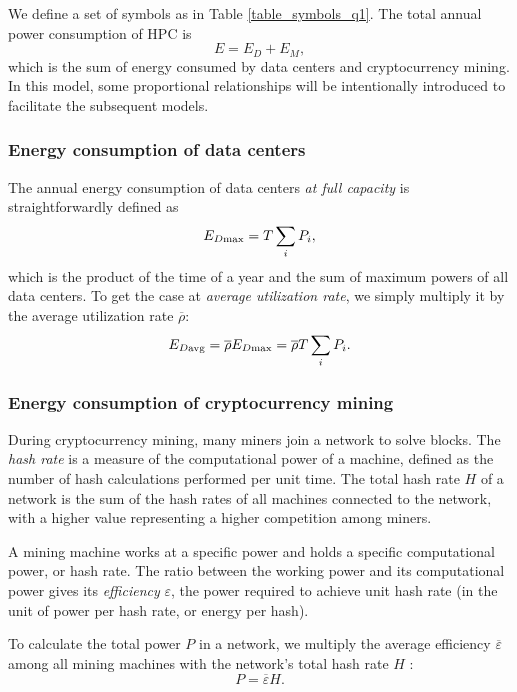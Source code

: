 \documentclass[12pt]{article}
\begin{document}
We define a set of symbols as in Table \ref{table_symbols_q1}. The total annual power consumption of HPC is
\begin{equation}
	E = E_D + E_M,
\end{equation}
which is the sum of energy consumed by data centers and cryptocurrency mining. In this model, some proportional relationships will be intentionally introduced to facilitate the subsequent models.

\subsubsection{Energy consumption of data centers}

The annual energy consumption of data centers \textit{at full capacity} is straightforwardly defined as
\begin{equation}
	E_{D \rm max} = T \sum_i P_i,
\end{equation}
which is the product of the time of a year and the sum of maximum powers of all data centers. To get the case at \textit{average utilization rate}, we simply multiply it by the average utilization rate $\overline{\rho}$:
\begin{equation}
	E_{D \rm avg} = \overline{\rho} E_{D \rm max} = \overline{\rho} T \sum_i P_i.
\end{equation}

\subsubsection{Energy consumption of cryptocurrency mining}

During cryptocurrency mining, many miners join a network to solve blocks. The \textit{hash rate} is a measure of the computational power of a machine, defined as the number of hash calculations performed per unit time. The total hash rate $H$ of a network is the sum of the hash rates of all machines connected to the network, with a higher value representing a higher competition among miners.

A mining machine works at a specific power and holds a specific computational power, or hash rate. The ratio between the working power and its computational power gives its \textit{efficiency} $\varepsilon$, the power required to achieve unit hash rate (in the unit of power per hash rate, or energy per hash).

To calculate the total power $P$ in a network, we multiply the average efficiency $\overline{\varepsilon}$ among all mining machines with the network's total hash rate $H$ \citep{btc_energy}:
\begin{equation}
	P = \overline{\varepsilon} H.
	\label{eq_mining_power}
\end{equation}
\end{document}
